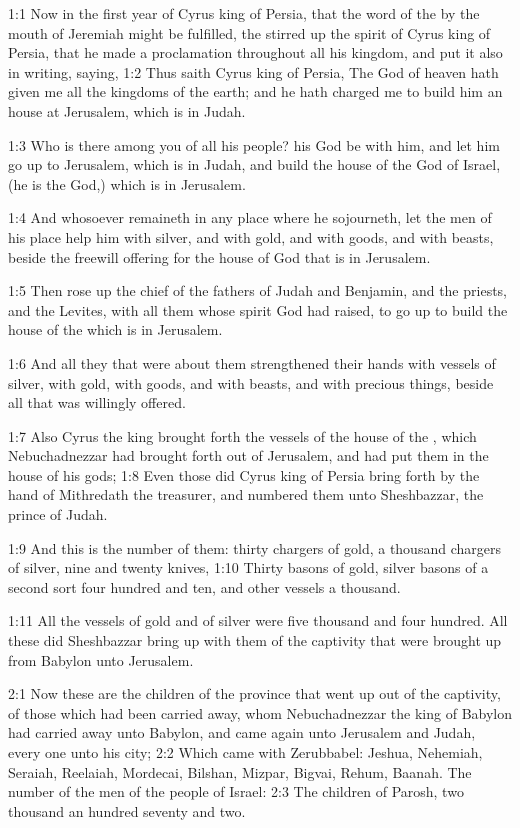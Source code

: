 

1:1 Now in the first year of Cyrus king of Persia, that the word of the \LORD by the mouth of Jeremiah might be fulfilled, the \LORD stirred up the spirit of Cyrus king of Persia, that he made a proclamation throughout all his kingdom, and put it also in writing, saying, 1:2 Thus saith Cyrus king of Persia, The \LORD God of heaven hath given me all the kingdoms of the earth; and he hath charged me to build him an house at Jerusalem, which is in Judah.

1:3 Who is there among you of all his people? his God be with him, and let him go up to Jerusalem, which is in Judah, and build the house of the \LORD God of Israel, (he is the God,) which is in Jerusalem.

1:4 And whosoever remaineth in any place where he sojourneth, let the men of his place help him with silver, and with gold, and with goods, and with beasts, beside the freewill offering for the house of God that is in Jerusalem.

1:5 Then rose up the chief of the fathers of Judah and Benjamin, and the priests, and the Levites, with all them whose spirit God had raised, to go up to build the house of the \LORD which is in Jerusalem.

1:6 And all they that were about them strengthened their hands with vessels of silver, with gold, with goods, and with beasts, and with precious things, beside all that was willingly offered.

1:7 Also Cyrus the king brought forth the vessels of the house of the \LORD, which Nebuchadnezzar had brought forth out of Jerusalem, and had put them in the house of his gods; 1:8 Even those did Cyrus king of Persia bring forth by the hand of Mithredath the treasurer, and numbered them unto Sheshbazzar, the prince of Judah.

1:9 And this is the number of them: thirty chargers of gold, a thousand chargers of silver, nine and twenty knives, 1:10 Thirty basons of gold, silver basons of a second sort four hundred and ten, and other vessels a thousand.

1:11 All the vessels of gold and of silver were five thousand and four hundred. All these did Sheshbazzar bring up with them of the captivity that were brought up from Babylon unto Jerusalem.

2:1 Now these are the children of the province that went up out of the captivity, of those which had been carried away, whom Nebuchadnezzar the king of Babylon had carried away unto Babylon, and came again unto Jerusalem and Judah, every one unto his city; 2:2 Which came with Zerubbabel: Jeshua, Nehemiah, Seraiah, Reelaiah, Mordecai, Bilshan, Mizpar, Bigvai, Rehum, Baanah. The number of the men of the people of Israel: 2:3 The children of Parosh, two thousand an hundred seventy and two.

